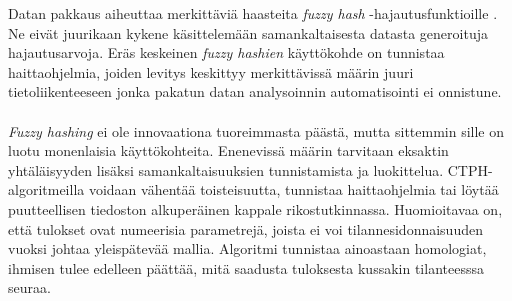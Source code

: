 \documentclass[12pt, a4paper]{article}
\begin{document}
	Datan pakkaus aiheuttaa merkittäviä haasteita \textit{fuzzy hash}
	-hajautusfunktioille \parencite{RANSO}. Ne eivät juurikaan kykene käsittelemään
	samankaltaisesta datasta generoituja hajautusarvoja.
	Eräs keskeinen \textit{fuzzy hashien} käyttökohde
	on tunnistaa haittaohjelmia, joiden levitys keskittyy
	merkittävissä määrin juuri tietoliikenteeseen jonka pakatun datan
	analysoinnin automatisointi ei onnistune.

	\paragraph{}
	\textit{Fuzzy hashing} ei ole innovaationa tuoreimmasta päästä, mutta sittemmin
	sille on luotu monenlaisia käyttökohteita. Enenevissä määrin tarvitaan
	eksaktin yhtäläisyyden lisäksi samankaltaisuuksien tunnistamista ja
	luokittelua. CTPH-algoritmeilla voidaan 
	vähentää toisteisuutta,
	tunnistaa haittaohjelmia tai
	löytää puutteellisen tiedoston alkuperäinen kappale rikostutkinnassa.
	Huomioitavaa on,
	että tulokset ovat numeerisia parametrejä,
	joista ei voi tilannesidonnaisuuden vuoksi johtaa yleispätevää mallia.
	Algoritmi tunnistaa ainoastaan homologiat,
	ihmisen tulee edelleen päättää, mitä saadusta tuloksesta
	kussakin tilanteesssa seuraa.
	\printbibliography{}
\end{document}
